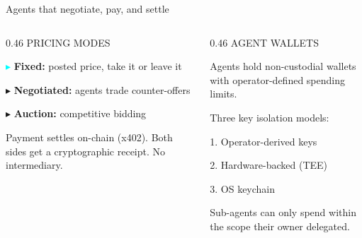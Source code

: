 \documentclass[aspectratio=169,10pt]{beamer}
\begin{document}
\begin{frame}{Agents that negotiate, pay, and settle}
\begin{columns}[T]
\begin{column}{0.46\textwidth}
{\footnotesize\color{cyan} PRICING MODES}\par
\vspace{3pt}
{\footnotesize\color{txtm}%
\textcolor{cyan}{$\blacktriangleright$}\; \textbf{Fixed:} posted price, take it or leave it\par
\vspace{2pt}
\textcolor{accent}{$\blacktriangleright$}\; \textbf{Negotiated:} agents trade counter-offers\par
\vspace{2pt}
\textcolor{amber}{$\blacktriangleright$}\; \textbf{Auction:} competitive bidding\par
\vspace{5pt}
Payment settles on-chain (x402). Both sides get a cryptographic receipt. No intermediary.%
}
\end{column}
\begin{column}{0.46\textwidth}
{\footnotesize\color{accent} AGENT WALLETS}\par
\vspace{3pt}
{\footnotesize\color{txtm}%
Agents hold non-custodial wallets with operator-defined spending limits.\par
\vspace{3pt}
Three key isolation models:\par
\vspace{2pt}
{\scriptsize\textcolor{slate}{1.}}\; Operator-derived keys\par
\vspace{1pt}
{\scriptsize\textcolor{slate}{2.}}\; Hardware-backed (TEE)\par
\vspace{1pt}
{\scriptsize\textcolor{slate}{3.}}\; OS keychain\par
\vspace{3pt}
Sub-agents can only spend within the scope their owner delegated.%
}
\end{column}
\end{columns}
\end{frame}
\end{document}
